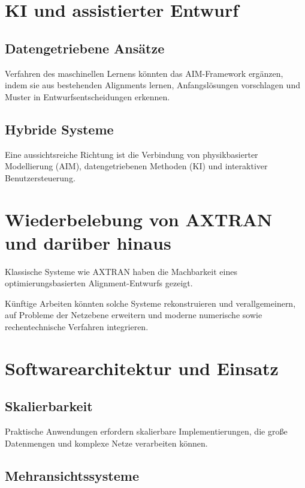 \section{KI und assistierter Entwurf}

\subsection{Datengetriebene Ansätze}

Verfahren des maschinellen Lernens könnten das AIM-Framework ergänzen,
indem sie aus bestehenden Alignments lernen, Anfangslösungen vorschlagen
und Muster in Entwurfsentscheidungen erkennen.

\subsection{Hybride Systeme}

Eine aussichtsreiche Richtung ist die Verbindung von physikbasierter
Modellierung (AIM), datengetriebenen Methoden (KI) und interaktiver
Benutzersteuerung.

\section{Wiederbelebung von AXTRAN und darüber hinaus}

Klassische Systeme wie AXTRAN haben die Machbarkeit eines
optimierungsbasierten Alignment-Entwurfs gezeigt.

Künftige Arbeiten könnten solche Systeme rekonstruieren und
verallgemeinern, auf Probleme der Netzebene erweitern und moderne
numerische sowie rechentechnische Verfahren integrieren.

\section{Softwarearchitektur und Einsatz}

\subsection{Skalierbarkeit}

Praktische Anwendungen erfordern skalierbare Implementierungen, die große
Datenmengen und komplexe Netze verarbeiten können.

\subsection{Mehransichtssysteme}

